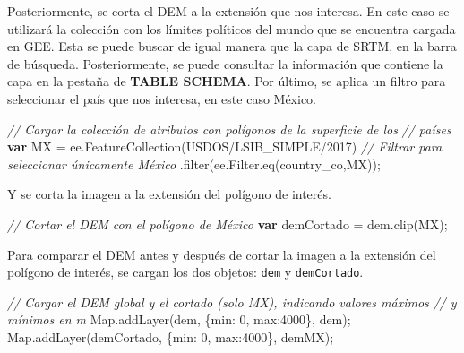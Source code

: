 \documentclass[
  12pt,
  letterpaper,
  twoside]{book}
\newenvironment{Shaded}{\begin{snugshade}}{\end{snugshade}}
\newcommand{\AttributeTok}[1]{\textcolor[rgb]{0.48,0.12,0.64}{#1}}
\newcommand{\BuiltInTok}[1]{#1}
\newcommand{\CommentTok}[1]{\textcolor[rgb]{0.24,0.58,0.00}{\textit{#1}}}
\newcommand{\DataTypeTok}[1]{\textcolor[rgb]{0.00,0.00,0.00}{#1}}
\newcommand{\DecValTok}[1]{\textcolor[rgb]{0.28,0.53,0.93}{#1}}
\newcommand{\FunctionTok}[1]{\textcolor[rgb]{0.48,0.12,0.64}{#1}}
\newcommand{\KeywordTok}[1]{\textcolor[rgb]{0.00,0.00,0.00}{\textbf{#1}}}
\newcommand{\NormalTok}[1]{#1}
\newcommand{\OperatorTok}[1]{\textcolor[rgb]{0.00,0.00,0.00}{#1}}
\newcommand{\StringTok}[1]{\textcolor[rgb]{0.87,0.29,0.22}{#1}}
\begin{document}
Posteriormente, se corta el DEM a la extensión que nos interesa. En este caso se utilizará la colección con los límites políticos del mundo que se encuentra cargada en GEE. Esta se puede buscar de igual manera que la capa de SRTM, en la barra de búsqueda. Posteriormente, se puede consultar la información que contiene la capa en la pestaña de \textbf{TABLE SCHEMA}. Por último, se aplica un filtro para seleccionar el país que nos interesa, en este caso México.

\begin{Shaded}
\begin{Highlighting}[]
\CommentTok{// Cargar la colección de atributos con polígonos de la superficie de los }
\CommentTok{// países}
\KeywordTok{var}\NormalTok{ MX }\OperatorTok{=}\NormalTok{ ee}\OperatorTok{.}\FunctionTok{FeatureCollection}\NormalTok{(}\StringTok{\textquotesingle{}USDOS/LSIB\_SIMPLE/2017\textquotesingle{}}\NormalTok{)}
   \CommentTok{// Filtrar para seleccionar únicamente México}
  \OperatorTok{.}\FunctionTok{filter}\NormalTok{(ee}\OperatorTok{.}\AttributeTok{Filter}\OperatorTok{.}\FunctionTok{eq}\NormalTok{(}\StringTok{\textquotesingle{}country\_co\textquotesingle{}}\OperatorTok{,}\StringTok{\textquotesingle{}MX\textquotesingle{}}\NormalTok{))}\OperatorTok{;}
\end{Highlighting}
\end{Shaded}

Y se corta la imagen a la extensión del polígono de interés.

\begin{Shaded}
\begin{Highlighting}[]
\CommentTok{// Cortar el DEM con el polígono de México}
\KeywordTok{var}\NormalTok{ demCortado }\OperatorTok{=}\NormalTok{ dem}\OperatorTok{.}\FunctionTok{clip}\NormalTok{(MX)}\OperatorTok{;}
\end{Highlighting}
\end{Shaded}

Para comparar el DEM antes y después de cortar la imagen a la extensión del polígono de interés, se cargan los dos objetos: \texttt{dem} y \texttt{demCortado}.

\begin{Shaded}
\begin{Highlighting}[]
\CommentTok{// Cargar el DEM global y el cortado (solo MX), indicando valores máximos }
\CommentTok{// y mínimos en m}
\BuiltInTok{Map}\OperatorTok{.}\FunctionTok{addLayer}\NormalTok{(dem}\OperatorTok{,}\NormalTok{ \{}\DataTypeTok{min}\OperatorTok{:} \DecValTok{0}\OperatorTok{,} \DataTypeTok{max}\OperatorTok{:}\DecValTok{4000}\NormalTok{\}}\OperatorTok{,} \StringTok{\textquotesingle{}dem\textquotesingle{}}\NormalTok{)}\OperatorTok{;}
\BuiltInTok{Map}\OperatorTok{.}\FunctionTok{addLayer}\NormalTok{(demCortado}\OperatorTok{,}\NormalTok{ \{}\DataTypeTok{min}\OperatorTok{:} \DecValTok{0}\OperatorTok{,} \DataTypeTok{max}\OperatorTok{:}\DecValTok{4000}\NormalTok{\}}\OperatorTok{,} \StringTok{\textquotesingle{}demMX\textquotesingle{}}\NormalTok{)}\OperatorTok{;}
\end{Highlighting}
\end{Shaded}
\end{document}
